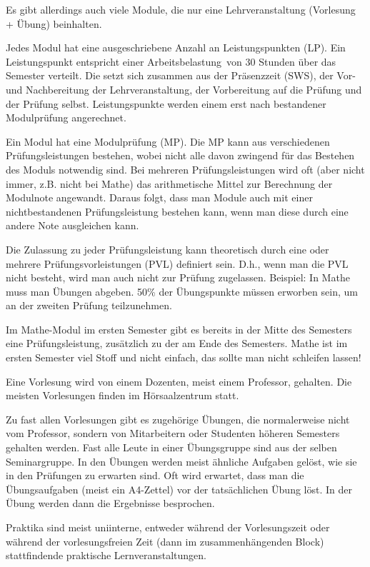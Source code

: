 \documentclass[a4paper,12pt]{report}
\begin{document}
\begin{itemize*}
	\item Es gibt allerdings auch viele Module, die nur eine Lehrveranstaltung (Vorlesung + Übung) beinhalten.
	\item Jedes Modul hat eine ausgeschriebene Anzahl an Leistungspunkten (LP).
	Ein Leistungspunkt entspricht einer \glqq Arbeitsbelastung\grqq\ von 30 Stunden über das Semester verteilt.
	Die setzt sich zusammen aus der Präsenzzeit (SWS), der Vor- und Nachbereitung der Lehrveranstaltung, der Vorbereitung auf die Prüfung und der Prüfung selbst.
	Leistungspunkte werden einem erst nach bestandener Modulprüfung angerechnet.
	\item Ein Modul hat eine Modulprüfung (MP).
	Die MP kann aus verschiedenen Prüfungsleistungen bestehen, wobei nicht alle davon zwingend für das Bestehen des Moduls notwendig sind.
	Bei mehreren Prüfungsleistungen wird oft (aber nicht immer, z.B. nicht bei Mathe) das arithmetische Mittel zur Berechnung der Modulnote angewandt.
	Daraus folgt, dass man Module auch mit einer nichtbestandenen Prüfungsleistung bestehen kann, wenn man diese durch eine andere Note ausgleichen kann.
	\item Die Zulassung zu jeder Prüfungsleistung kann theoretisch durch eine oder mehrere Prüfungsvorleistungen (PVL) definiert sein.
	D.h., wenn man die PVL nicht besteht, wird man auch nicht zur Prüfung zugelassen.
	Beispiel: In Mathe muss man Übungen abgeben.
	50\% der Übungspunkte müssen erworben sein, um an der zweiten Prüfung teilzunehmen.
	\item Im Mathe-Modul im ersten Semester gibt es bereits in der Mitte des Semesters eine Prüfungsleistung, zusätzlich zu der am Ende des Semesters.
	Mathe ist im ersten Semester viel Stoff und nicht einfach, das sollte man nicht schleifen lassen!
	\item Eine Vorlesung wird von einem Dozenten, meist einem Professor, gehalten.
	Die meisten Vorlesungen finden im Hörsaalzentrum statt.
	\item Zu fast allen Vorlesungen gibt es zugehörige Übungen, die normalerweise nicht vom Professor, sondern von Mitarbeitern oder Studenten höheren Semesters gehalten werden.
	Fast alle Leute in einer Übungsgruppe sind aus der selben Seminargruppe.
	In den Übungen werden meist ähnliche Aufgaben gelöst, wie sie in den Prüfungen zu erwarten sind.
	Oft wird erwartet, dass man die Übungsaufgaben (meist ein A4-Zettel) vor der tatsächlichen Übung löst.
	In der Übung werden dann die Ergebnisse besprochen.
	\item Praktika sind meist uniinterne, entweder während der Vorlesungszeit oder während der vorlesungsfreien Zeit (dann im zusammenhängenden Block) stattfindende praktische Lernveranstaltungen.

\end{itemize*}
\end{document}
